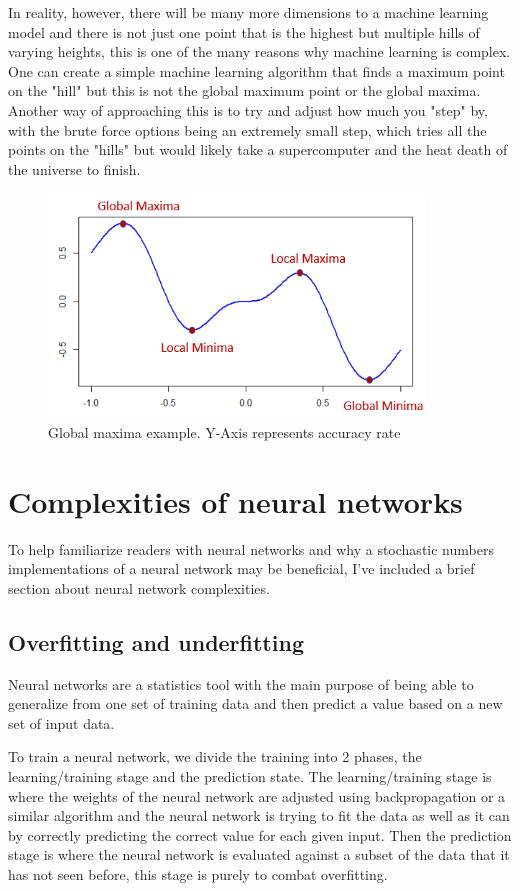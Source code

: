 \documentclass[a4paper,oneside,phd,etd]{BYUPhys}
\begin{document}
In reality, however, there will be many more dimensions to a machine learning model and there is not just one point that is the highest but multiple hills of varying heights, this is one of the many reasons why machine learning is complex. One can create a simple machine learning algorithm that finds a maximum point on the "hill" but this is not the global maximum point or the global maxima. Another way of approaching this is to try and adjust how much you "step" by, with the brute force options being an extremely small step, which tries all the points on the "hills" but would likely take a supercomputer and the heat death of the universe to finish. 
\begin{figure}[H]
\centering
\includegraphics[width=10cm]{pictures/global_minima.png}
\caption{Global maxima example.
Y-Axis represents accuracy rate}
\label{fig:global_minima}
\end{figure}

\section{Complexities of neural networks}
To help familiarize readers with neural networks and why a stochastic numbers implementations of a neural network may be beneficial, I've included a brief section about neural network complexities.

\subsection{Overfitting and underfitting}
Neural networks are a statistics tool with the main purpose of being able to generalize from one set of training data and then predict a value based on a new set of input data. 

To train a neural network, we divide the training into 2 phases, the learning/training stage and the prediction state. The learning/training stage is where the weights of the neural network are adjusted using backpropagation or a similar algorithm and the neural network is trying to fit the data as well as it can by correctly predicting the correct value for each given input. Then the prediction stage is where the neural network is evaluated against a subset of the data that it has not seen before, this stage is purely to combat overfitting\cite{overfitting}.
\end{document}

